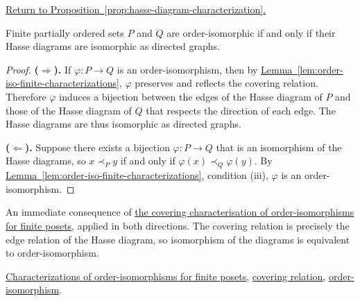 
\newpage
{}
\label{prf:hasse-diagram-characterization}

\begin{remark*}[Return]
\hyperref[prop:hasse-diagram-characterization]{Return to Proposition~\ref*{prop:hasse-diagram-characterization}.}
\end{remark*}

\begin{theorem*}
Finite partially ordered sets $P$ and $Q$ are order-isomorphic if and only
if their Hasse diagrams are isomorphic as directed graphs.
\end{theorem*}

\begin{proof}[Proof]
\textbf{($\Rightarrow$).}  If $\varphi : P \to Q$ is an order-isomorphism,
then by
\hyperref[lem:order-iso-finite-characterizations]{Lemma~\ref*{lem:order-iso-finite-characterizations}},
$\varphi$ preserves and reflects the covering relation.  Therefore $\varphi$
induces a bijection between the edges of the Hasse diagram of $P$ and those
of the Hasse diagram of $Q$ that respects the direction of each edge.  The
Hasse diagrams are thus isomorphic as directed graphs.

\textbf{($\Leftarrow$).}  Suppose there exists a bijection $\varphi : P \to Q$
that is an isomorphism of the Hasse diagrams, so $x \prec_P y$ if and only
if $\varphi(x) \prec_Q \varphi(y)$.  By
\hyperref[lem:order-iso-finite-characterizations]{Lemma~\ref*{lem:order-iso-finite-characterizations}},
condition (iii), $\varphi$ is an order-isomorphism.
\end{proof}

\begin{remark*}
An immediate consequence of
\hyperref[lem:order-iso-finite-characterizations]{the covering characterisation of order-isomorphisms for finite posets},
applied in both directions.  The covering relation is precisely the edge
relation of the Hasse diagram, so isomorphism of the diagrams is equivalent
to order-isomorphism.
\end{remark*}

\begin{remark*}[Dependencies]
\hyperref[lem:order-iso-finite-characterizations]{Characterizations of order-isomorphisms for finite posets},
\hyperref[def:covering-relation]{covering relation},
\hyperref[def:order-isomorphism]{order-isomorphism}.
\end{remark*}
